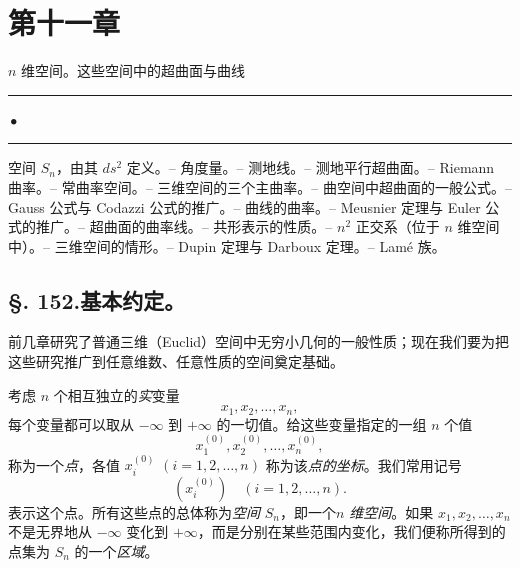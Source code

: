 \section*{第十一章}

\begin{center}
{\Large \(n\) 维空间。这些空间中的超曲面与曲线}\par
\vspace{0.5em}
\rule{0.16\textwidth}{0.4pt}\,\(\bullet\)\,\rule{0.16\textwidth}{0.4pt}
\end{center}

\begin{center}\small
空间 \(S_n\)，由其 \(ds^2\) 定义。-- 角度量。-- 测地线。-- 测地平行超曲面。-- Riemann 曲率。-- 常曲率空间。-- 三维空间的三个主曲率。-- 曲空间中超曲面的一般公式。-- Gauss 公式与 Codazzi 公式的推广。-- 曲线的曲率。-- Meusnier 定理与 Euler 公式的推广。-- 超曲面的曲率线。-- 共形表示的性质。-- \(n^2\) 正交系（位于 \(n\) 维空间中）。-- 三维空间的情形。-- Dupin 定理与 Darboux 定理。-- Lamé 族。
\end{center}

\subsection*{\S. 152.\quad 基本约定。}

前几章研究了普通三维（Euclid）空间中无穷小几何的一般性质；现在我们要为把这些研究推广到任意维数、任意性质的空间奠定基础。

考虑 \(n\) 个相互独立的\emph{实}变量
\[
 x_1,x_2,\ldots,x_n,
\]
每个变量都可以取从 \(-\infty\) 到 \(+\infty\) 的一切值。给这些变量指定的一组 \(n\) 个值
\[
 x_1^{(0)},x_2^{(0)},\ldots,x_n^{(0)},
\]
称为一个\emph{点}，各值 \(x_i^{(0)}\) \((i=1,2,\ldots,n)\) 称为该\emph{点的坐标}。我们常用记号
\[
 (x_i^{(0)})\quad (i=1,2,\ldots,n).
\]
表示这个点。所有这些点的总体称为\emph{空间} \(S_n\)，即一个\emph{\(n\) 维空间}。如果 \(x_1,x_2,\ldots,x_n\) 不是无界地从 \(-\infty\) 变化到 \(+\infty\)，而是分别在某些范围内变化，我们便称所得到的点集为 \(S_n\) 的一个\emph{区域}。

